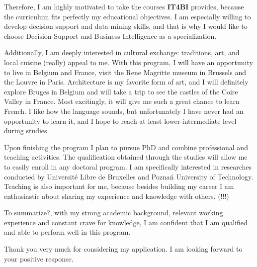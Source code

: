 \documentclass[a4paper,12pt]{article}
\begin{document}
Therefore, I am highly motivated to take the courses \textbf{IT4BI} provides, because the curriculum fits perfectly my educational objectives. I am especially willing to develop decision support and data mining skills, and that is why I would like to choose Decision Support and Business Intelligence as a specialization.

Additionally, I am deeply interested in cultural exchange: traditions, art, and local cuisine (really) appeal to me. With this program, I will have an opportunity to live in Belgium and France, visit the Rene Magritte museum in Brussels and the Louvre in Paris. Architecture is my favorite form of art, and I will definitely explore Bruges in Belgium and will take a trip to see the castles of the Coire Valley in France. Most excitingly, it will give me such a great chance to learn French. I like how the language sounds, but unfortunately I have never had an opportunity to learn it, and I hope to reach at least lower-intermediate level during studies.

Upon finishing the program I plan to pursue PhD and combine professional and teaching activities. The qualification obtained through the studies will allow me to easily enroll in any doctoral program. I am specifically interested in researches conducted by Universit\'e Libre de Bruxelles and Pozna\'n University of Technology. Teaching is also important for me, because besides building my career I am enthusiastic about sharing my experience and knowledge with others. (!!!)

To summarize?, with my strong academic background, relevant working experience and constant crave for knowledge, I am confident that I am qualified and able to perform well in this program.

Thank you very much for considering my application. I am looking forward to your positive response.
\end{document}
